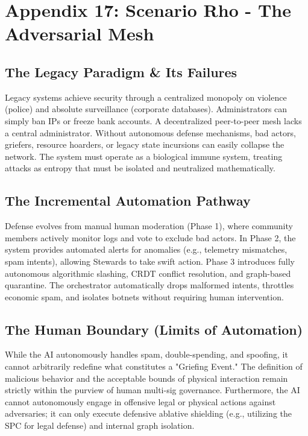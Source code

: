 \chapter{Appendix 17: Scenario Rho - The Adversarial Mesh}

\section{The Legacy Paradigm \& Its Failures}
Legacy systems achieve security through a centralized monopoly on violence (police) and absolute surveillance (corporate databases). Administrators can simply ban IPs or freeze bank accounts. A decentralized peer-to-peer mesh lacks a central administrator. Without autonomous defense mechanisms, bad actors, griefers, resource hoarders, or legacy state incursions can easily collapse the network. The system must operate as a biological immune system, treating attacks as entropy that must be isolated and neutralized mathematically.

\section{The Incremental Automation Pathway}
Defense evolves from manual human moderation (Phase 1), where community members actively monitor logs and vote to exclude bad actors. In Phase 2, the system provides automated alerts for anomalies (e.g., telemetry mismatches, spam intents), allowing Stewards to take swift action. Phase 3 introduces fully autonomous algorithmic slashing, CRDT conflict resolution, and graph-based quarantine. The orchestrator automatically drops malformed intents, throttles economic spam, and isolates botnets without requiring human intervention.

\section{The Human Boundary (Limits of Automation)}
While the AI autonomously handles spam, double-spending, and spoofing, it cannot arbitrarily redefine what constitutes a "Griefing Event." The definition of malicious behavior and the acceptable bounds of physical interaction remain strictly within the purview of human multi-sig governance. Furthermore, the AI cannot autonomously engage in offensive legal or physical actions against adversaries; it can only execute defensive ablative shielding (e.g., utilizing the SPC for legal defense) and internal graph isolation.

